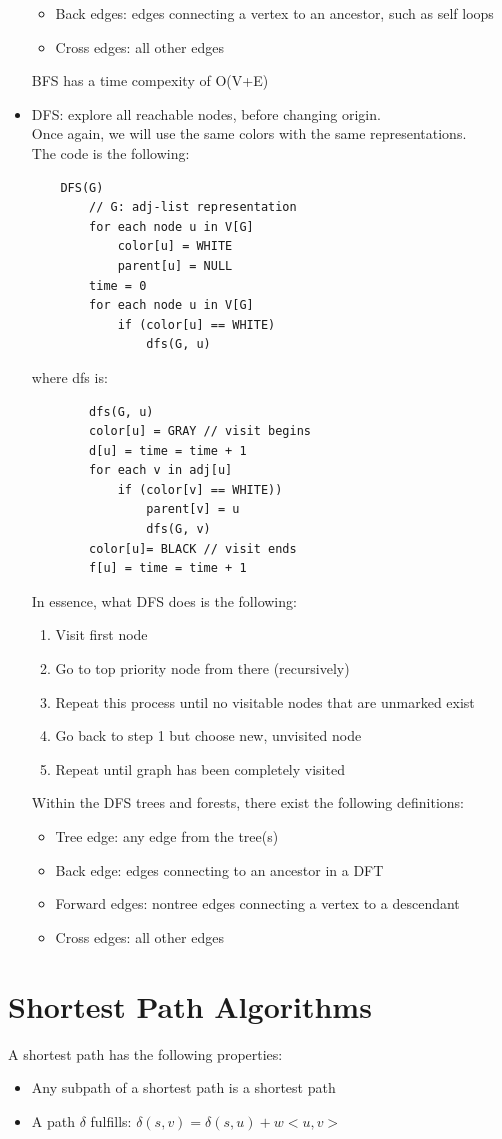 \documentclass[nobib]{tufte-handout}
\begin{document}
\begin{itemize}
\begin{itemize}
        \item Back edges: edges connecting a vertex to an ancestor, such as self loops
        \item Cross edges: all other edges
    \end{itemize}
    BFS has a time compexity of O(V+E)
    \item DFS: explore all reachable nodes, before changing origin.\\
    Once again, we will use the same colors with the same representations.\\
    The code is the following:
    \begin{lstlisting}
    DFS(G)
        // G: adj-list representation
        for each node u in V[G]
            color[u] = WHITE
            parent[u] = NULL
        time = 0
        for each node u in V[G]
            if (color[u] == WHITE)
                dfs(G, u)
    \end{lstlisting}
    where dfs is:
    \begin{lstlisting}
        dfs(G, u)
        color[u] = GRAY // visit begins
        d[u] = time = time + 1
        for each v in adj[u]
            if (color[v] == WHITE))
                parent[v] = u
                dfs(G, v)
        color[u]= BLACK // visit ends
        f[u] = time = time + 1
    \end{lstlisting}
    In essence, what DFS does is the following:
    \begin{enumerate}
        \item Visit first node
        \item Go to top priority node from there (recursively)
        \item Repeat this process until no visitable nodes that are unmarked exist
        \item Go back to step 1 but choose new, unvisited node
        \item Repeat until graph has been completely visited
    \end{enumerate}
    Within the DFS trees and forests, there exist the following definitions:
    \begin{itemize}
        \item Tree edge: any edge from the tree(s)
        \item Back edge: edges connecting to an ancestor in a DFT
        \item Forward edges: nontree edges connecting a vertex to a descendant
        \item Cross edges: all other edges
    \end{itemize}
\end{itemize}
\section{Shortest Path Algorithms}
A shortest path has the following properties: 
\begin{itemize}
    \item Any subpath of a shortest path is a shortest path
    \item A path $\delta$ fulfills: $\delta(s,v) = \delta(s,u) + w<u,v>$
\end{itemize}
\end{document}
